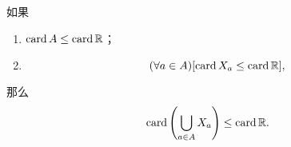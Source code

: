 \begin{proposition}
如果
\begin{enumerate}
	\item \(\operatorname{card} A \leq \operatorname{card}\mathbb{R}\)；
	\item \[
		(\forall a \in A)
		[\operatorname{card} X_a \leq \operatorname{card}\mathbb{R}],
	\]
\end{enumerate}
那么\[
	\operatorname{card}\left( \bigcup_{a \in A} X_a \right) \leq \operatorname{card}\mathbb{R}.
\]
\end{proposition}
